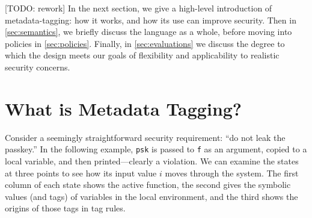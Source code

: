 \documentclass{llncs}
\begin{document}
[TODO: rework]
In the next section, we give a high-level introduction of metadata-tagging: how it works,
and how its use can improve security. Then in \cref{sec:semantics}, we briefly discuss the
language as a whole, before moving into policies in \cref{sec:policies}. Finally, in
\cref{sec:evaluations} we discuss the degree to
which the design meets our goals of flexibility and applicability to realistic
security concerns.

\section{What is Metadata Tagging?}

Consider a seemingly straightforward security requirement: ``do not leak the passkey.''
In the following example, {\tt psk} is passed to {\tt f} as an argument, copied to
a local variable, and then printed---clearly a violation. We can examine the states at
three points to see how its input value \(i\) moves through the system. The first column
of each state shows the active function, the second gives the symbolic values (and tags)
of variables in the local environment, and the third shows the origins of those tags in
tag rules.
\end{document}
